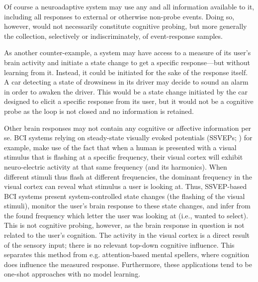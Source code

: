 Of course a neuroadaptive system may use any and all information available to it, including all responses to external or otherwise non-probe events. Doing so, however, would not necessarily constitute cognitive probing, but more generally the collection, selectively or indiscriminately, of event-response samples. 

As another counter-example, a system may have access to a measure of its user's brain activity and initiate a state change to get a specific response---but without learning from it. Instead, it could be initiated for the sake of the response itself. A car detecting a state of drowsiness in its driver may decide to sound an alarm in order to awaken the driver. This would be a state change initiated by the car designed to elicit a specific response from its user, but it would not be a cognitive probe as the loop is not closed and no information is retained.

Other brain responses may not contain any cognitive or affective information per se. BCI systems relying on steady-state visually evoked potentials (SSVEPs; ) for example, make use of the fact that when a human is presented with a visual stimulus that is flashing at a specific frequency, their visual cortex will exhibit neuro-electric activity at that same frequency (and its harmonics). When different stimuli thus flash at different frequencies, the dominant frequency in the visual cortex can reveal what stimulus a user is looking at. Thus, SSVEP-based BCI systems present system-controlled state changes (the flashing of the visual stimuli), monitor the user's brain response to these state changes, and infer from the found frequency which letter the user was looking at (i.e., wanted to select). This is not cognitive probing, however, as the brain response in question is not related to the user's cognition. The activity in the visual cortex is a direct result of the sensory input; there is no relevant top-down cognitive influence. This separates this method from e.g. attention-based mental spellers, where cognition does influence the measured response. Furthermore, these applications tend to be one-shot approaches with no model learning.

